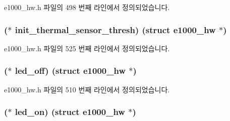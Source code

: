 e1000\+\_\+hw.\+h 파일의 498 번째 라인에서 정의되었습니다.

\subsubsection[{\texorpdfstring{init\+\_\+thermal\+\_\+sensor\+\_\+thresh}{init_thermal_sensor_thresh}}]{($\ast$ init\+\_\+thermal\+\_\+sensor\+\_\+thresh) (struct {\bf e1000\+\_\+hw} $\ast$)}\hypertarget{structe1000__mac__operations_aa5b6c364175ebc48c0891fd5ae929acd}{}\label{structe1000__mac__operations_aa5b6c364175ebc48c0891fd5ae929acd}


e1000\+\_\+hw.\+h 파일의 525 번째 라인에서 정의되었습니다.

\subsubsection[{\texorpdfstring{led\+\_\+off}{led_off}}]{($\ast$ led\+\_\+off) (struct {\bf e1000\+\_\+hw} $\ast$)}\hypertarget{structe1000__mac__operations_a30ddd0007e69abb1c3e0f27a3204c3e4}{}\label{structe1000__mac__operations_a30ddd0007e69abb1c3e0f27a3204c3e4}


e1000\+\_\+hw.\+h 파일의 510 번째 라인에서 정의되었습니다.

\subsubsection[{\texorpdfstring{led\+\_\+on}{led_on}}]{($\ast$ led\+\_\+on) (struct {\bf e1000\+\_\+hw} $\ast$)}\hypertarget{structe1000__mac__operations_a1130a8a99a00a299152c532190a24ba1}{}\label{structe1000__mac__operations_a1130a8a99a00a299152c532190a24ba1}


